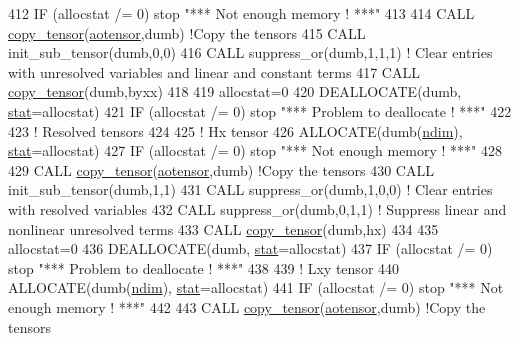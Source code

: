 \begin{DoxyCode}
412     \textcolor{keywordflow}{IF} (allocstat /= 0) stop \textcolor{stringliteral}{"*** Not enough memory ! ***"}
413 
414     \textcolor{keyword}{CALL }\hyperlink{namespacetensor_a4a88ee8077278486c5128ad97617969e}{copy\_tensor}(\hyperlink{namespaceaotensor__def_a0dc43bc9294a18f2fe57b67489f1702f}{aotensor},dumb) \textcolor{comment}{!Copy the tensors}
415     \textcolor{keyword}{CALL }init\_sub\_tensor(dumb,0,0)
416     \textcolor{keyword}{CALL }suppress\_or(dumb,1,1,1) \textcolor{comment}{! Clear entries with unresolved variables and linear and constant terms}
417     \textcolor{keyword}{CALL }\hyperlink{namespacetensor_a4a88ee8077278486c5128ad97617969e}{copy\_tensor}(dumb,byxx)
418 
419     allocstat=0
420     \textcolor{keyword}{DEALLOCATE}(dumb, \hyperlink{namespacestat}{stat}=allocstat)
421     \textcolor{keywordflow}{IF} (allocstat /= 0)  stop \textcolor{stringliteral}{"*** Problem to deallocate ! ***"}
422 
423     \textcolor{comment}{! Resolved tensors}
424 
425     \textcolor{comment}{! Hx tensor}
426     \textcolor{keyword}{ALLOCATE}(dumb(\hyperlink{namespaceparams_a2323fe1773f086e20c14f266351c482b}{ndim}), \hyperlink{namespacestat}{stat}=allocstat)
427     \textcolor{keywordflow}{IF} (allocstat /= 0) stop \textcolor{stringliteral}{"*** Not enough memory ! ***"}
428 
429     \textcolor{keyword}{CALL }\hyperlink{namespacetensor_a4a88ee8077278486c5128ad97617969e}{copy\_tensor}(\hyperlink{namespaceaotensor__def_a0dc43bc9294a18f2fe57b67489f1702f}{aotensor},dumb) \textcolor{comment}{!Copy the tensors}
430     \textcolor{keyword}{CALL }init\_sub\_tensor(dumb,1,1)
431     \textcolor{keyword}{CALL }suppress\_or(dumb,1,0,0) \textcolor{comment}{! Clear entries with resolved variables}
432     \textcolor{keyword}{CALL }suppress\_or(dumb,0,1,1) \textcolor{comment}{! Suppress linear and nonlinear unresolved terms}
433     \textcolor{keyword}{CALL }\hyperlink{namespacetensor_a4a88ee8077278486c5128ad97617969e}{copy\_tensor}(dumb,hx)
434 
435     allocstat=0
436     \textcolor{keyword}{DEALLOCATE}(dumb, \hyperlink{namespacestat}{stat}=allocstat)
437     \textcolor{keywordflow}{IF} (allocstat /= 0)  stop \textcolor{stringliteral}{"*** Problem to deallocate ! ***"}
438 
439     \textcolor{comment}{! Lxy tensor}
440     \textcolor{keyword}{ALLOCATE}(dumb(\hyperlink{namespaceparams_a2323fe1773f086e20c14f266351c482b}{ndim}), \hyperlink{namespacestat}{stat}=allocstat)
441     \textcolor{keywordflow}{IF} (allocstat /= 0) stop \textcolor{stringliteral}{"*** Not enough memory ! ***"}
442 
443     \textcolor{keyword}{CALL }\hyperlink{namespacetensor_a4a88ee8077278486c5128ad97617969e}{copy\_tensor}(\hyperlink{namespaceaotensor__def_a0dc43bc9294a18f2fe57b67489f1702f}{aotensor},dumb) \textcolor{comment}{!Copy the tensors}

\end{DoxyCode}
